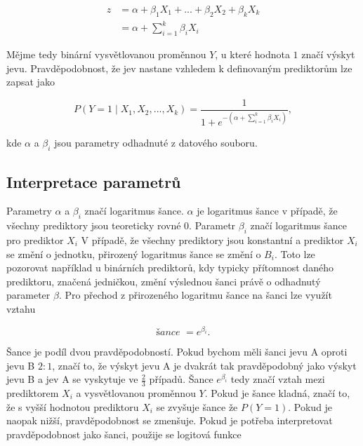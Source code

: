 \begin{equation}
    \label{eq:linearni_kombinace_z}
    \begin{split}
        z &= \alpha + \beta_1 X_1 + ... + \beta_2 X_2 +\beta_k X_k \\
          &= \alpha + \sum_{i=1}^k \beta_i X_i
    \end{split}
\end{equation}

Mějme tedy binární vysvětlovanou proměnnou $Y$, u které hodnota $1$ značí výskyt jevu. Pravděpodobnost, že jev nastane
vzhledem k definovaným prediktorům lze zapsat jako

\begin{equation}
    \label{eq:pravdepodobnost_y}
    P(Y = 1 \mid X_1, X_2, ..., X_k) = \frac{1}{1 + e^{- \left( \alpha + \sum_{i=1}^k \beta_i X_i \right) }},
\end{equation}

kde $\alpha$ a $\beta_i$ jsou parametry odhadnuté z datového souboru. 

\subsection{Interpretace parametrů}
Parametry $\alpha$ a $\beta_i$ značí logaritmus šance. $\alpha$ je logaritmus šance v případě, že všechny prediktory
jsou teoreticky rovné $0$. Parametr $\beta_i$ značí logaritmus šance pro prediktor $X_i$
{\color{red}
V případě, že všechny prediktory jsou konstantní a prediktor $X_i$ se změní o jednotku, přirozený logaritmus
šance se změní o $B_i$. Toto lze pozorovat například u binárních prediktorů, kdy typicky přítomnost
daného prediktoru, značená jedničkou, změní výslednou šanci právě o odhadnutý parameter $\beta$.
Pro přechod z přirozeného logaritmu šance na šanci lze využít vztahu
}

\begin{equation}
\textit{šance } = e^{\beta_i}.
\end{equation}

Šance je podíl dvou pravděpodobností. Pokud bychom měli šanci jevu A oproti jevu B $2 : 1$, značí to, že výskyt jevu A je dvakrát tak pravděpodobný
jako výskyt jevu B a jev A se vyskytuje ve $\frac{2}{3}$ případů. Šance $e^{\beta_i}$ tedy značí vztah mezi prediktorem $X_i$ a vysvětlovanou proměnnou $Y$. Pokud je
šance kladná, značí to, že s vyšší hodnotou prediktoru $X_i$ se zvyšuje šance že $P(Y = 1)$. Pokud je naopak nižší, pravděpodobnost se zmenšuje. Pokud je potřeba
interpretovat pravděpodobnost jako šanci, použije se logitová funkce

